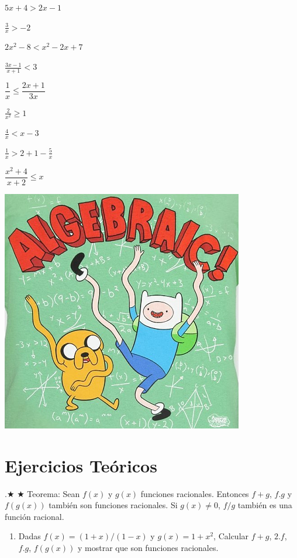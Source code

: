 \documentclass[a4paper,11pt,spanish,sans]{exam}
\begin{document}
\begin{enumerate}
\begin{multicols}{3}
\item $5x+4 > 2x-1 $
\item $\frac{3}{x} > -2 $
\item $2x^2-8 < x^2-2x+7$
\item $\frac{3x-1}{x+1} < 3$
\item $\dfrac{1}{x} \leq \dfrac{2x+1}{3x}$


\columnbreak

\item $\frac{2}{x^2}\geq 1$
\item $\frac{4}{x} < x-3$
\item $\frac{1}{x} >  2+1-\frac{5}{x}$
\item $\dfrac{x^2+4}{x+2} \leq x$

\columnbreak

\includegraphics[width= 0.7\columnwidth]{algebraic.png}
\label{fig:algeb}

\end{multicols}
\end{enumerate} 

\section{Ejercicios Teóricos}.$\bigstar$  $\bigstar$
Teorema: Sean $f(x)$ y $g(x)$ funciones racionales. Entonces $f+g$, $f.g$ y $f(g(x))$ también son funciones racionales. Si $g(x) \neq 0 $, $f/g$ también es una función racional.


\begin{enumerate}

\item Dadas $f(x)=(1+x)/(1-x)$ y $g(x)=1+x^2$, Calcular $f+g$, $2.f$, $f.g$, $f(g(x))$ y mostrar que son funciones racionales.

\end{enumerate}
\end{document}

